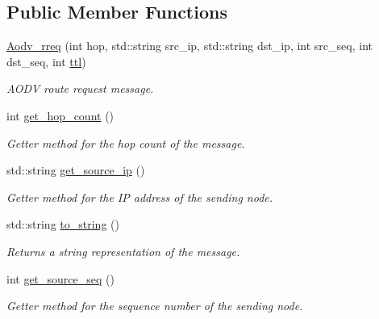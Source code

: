 \subsection*{Public Member Functions}
\begin{DoxyCompactItemize}
\item 
\hyperlink{class_aodv__rreq_adf5effed008a795ee9914a8cb8f1c59c}{Aodv\+\_\+rreq} (int hop, std\+::string src\+\_\+ip, std\+::string dst\+\_\+ip, int src\+\_\+seq, int dst\+\_\+seq, int \hyperlink{class_aodv__message_a4d7215436d8efb6bcced6ae6a2dc6f33}{ttl})\hypertarget{class_aodv__rreq_adf5effed008a795ee9914a8cb8f1c59c}{}\label{class_aodv__rreq_adf5effed008a795ee9914a8cb8f1c59c}

\begin{DoxyCompactList}\small\item\em A\+O\+DV route request message. \end{DoxyCompactList}\item 
int \hyperlink{class_aodv__rreq_a7e9a7869c46962f9ff93dad0b2c1053d}{get\+\_\+hop\+\_\+count} ()\hypertarget{class_aodv__rreq_a7e9a7869c46962f9ff93dad0b2c1053d}{}\label{class_aodv__rreq_a7e9a7869c46962f9ff93dad0b2c1053d}

\begin{DoxyCompactList}\small\item\em Getter method for the hop count of the message. \end{DoxyCompactList}\item 
std\+::string \hyperlink{class_aodv__rreq_a779f266d0ee485860f59d72f82685453}{get\+\_\+source\+\_\+ip} ()\hypertarget{class_aodv__rreq_a779f266d0ee485860f59d72f82685453}{}\label{class_aodv__rreq_a779f266d0ee485860f59d72f82685453}

\begin{DoxyCompactList}\small\item\em Getter method for the IP address of the sending node. \end{DoxyCompactList}\item 
std\+::string \hyperlink{class_aodv__rreq_ad743336a946da8d6a8eb300651973d5e}{to\+\_\+string} ()\hypertarget{class_aodv__rreq_ad743336a946da8d6a8eb300651973d5e}{}\label{class_aodv__rreq_ad743336a946da8d6a8eb300651973d5e}

\begin{DoxyCompactList}\small\item\em Returns a string representation of the message. \end{DoxyCompactList}\item 
int \hyperlink{class_aodv__rreq_a005ff0f29aea44171b1fedca685553c4}{get\+\_\+source\+\_\+seq} ()\hypertarget{class_aodv__rreq_a005ff0f29aea44171b1fedca685553c4}{}\label{class_aodv__rreq_a005ff0f29aea44171b1fedca685553c4}

\begin{DoxyCompactList}\small\item\em Getter method for the sequence number of the sending node. \end{DoxyCompactList}\end{DoxyCompactItemize}
